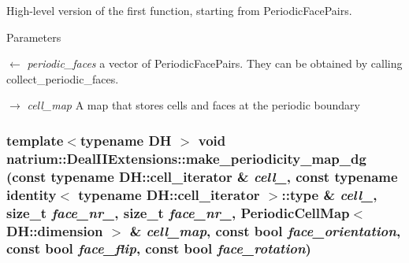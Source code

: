 High-\/level version of the first function, starting from PeriodicFacePairs. 
\begin{DoxyParams}{Parameters}
\item[\mbox{$\leftarrow$} {\em periodic\_\-faces}]a vector of PeriodicFacePairs. They can be obtained by calling collect\_\-periodic\_\-faces. \item[\mbox{$\rightarrow$} {\em cell\_\-map}]A map that stores cells and faces at the periodic boundary \end{DoxyParams}
\hypertarget{namespacenatrium_1_1DealIIExtensions_a6bc5b9999ee7c47791ea8754f586277e}{
\subsubsection[{make\_\-periodicity\_\-map\_\-dg}]{\setlength{\rightskip}{0pt plus 5cm}template$<$typename DH $>$ void natrium::DealIIExtensions::make\_\-periodicity\_\-map\_\-dg (const typename DH::cell\_\-iterator \& {\em cell\_}, \/  const typename identity$<$ typename DH::cell\_\-iterator $>$::type \& {\em cell\_}, \/  size\_\-t {\em face\_\-nr\_}, \/  size\_\-t {\em face\_\-nr\_}, \/  PeriodicCellMap$<$ DH::dimension $>$ \& {\em cell\_\-map}, \/  const bool {\em face\_\-orientation}, \/  const bool {\em face\_\-flip}, \/  const bool {\em face\_\-rotation})}}
\label{namespacenatrium_1_1DealIIExtensions_a6bc5b9999ee7c47791ea8754f586277e}


